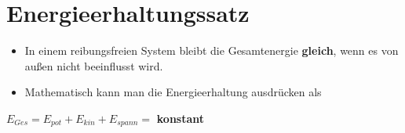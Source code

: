 \documentclass{article}
\begin{document}
\section*{Energieerhaltungssatz}
\begin{itemize}
	\item In einem reibungsfreien System bleibt die Gesamtenergie \textbf{gleich}, wenn es von außen nicht beeinflusst wird.
	\item Mathematisch kann man die Energieerhaltung ausdrücken als
\end{itemize}
\begin{center}
	$E_{Ges} = E_{pot} + E_{kin} + E_{spann} = $ \textbf{konstant}
\end{center}
\end{document}
